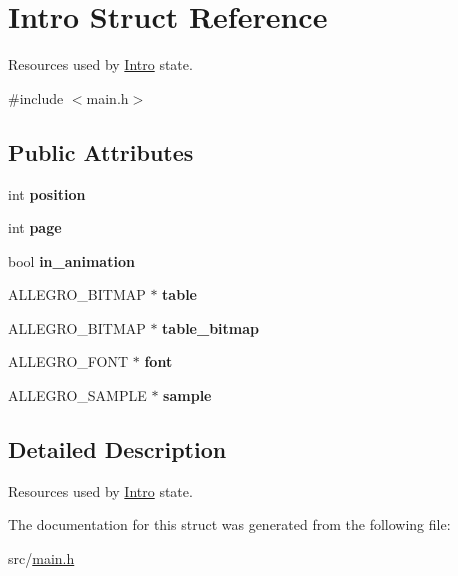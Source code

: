 \hypertarget{structIntro}{\section{\-Intro \-Struct \-Reference}
\label{structIntro}
}


\-Resources used by \hyperlink{structIntro}{\-Intro} state.  




{\ttfamily \#include $<$main.\-h$>$}

\subsection*{\-Public \-Attributes}
\begin{DoxyCompactItemize}
\item 
\hypertarget{structIntro_a5c266b2590d4304f92fd3bad033f4375}{int {\bfseries position}}\label{structIntro_a5c266b2590d4304f92fd3bad033f4375}

\item 
\hypertarget{structIntro_aaea1b2d24c0c9a5437c59d727c79ebd1}{int {\bfseries page}}\label{structIntro_aaea1b2d24c0c9a5437c59d727c79ebd1}

\item 
\hypertarget{structIntro_a2876fd8a7bfd940c3936eb6445984a22}{bool {\bfseries in\-\_\-animation}}\label{structIntro_a2876fd8a7bfd940c3936eb6445984a22}

\item 
\hypertarget{structIntro_a342227f3940dba9ed6b5d3bb4579fd48}{\-A\-L\-L\-E\-G\-R\-O\-\_\-\-B\-I\-T\-M\-A\-P $\ast$ {\bfseries table}}\label{structIntro_a342227f3940dba9ed6b5d3bb4579fd48}

\item 
\hypertarget{structIntro_a640d8fa662e2d06fb01069c4b374209e}{\-A\-L\-L\-E\-G\-R\-O\-\_\-\-B\-I\-T\-M\-A\-P $\ast$ {\bfseries table\-\_\-bitmap}}\label{structIntro_a640d8fa662e2d06fb01069c4b374209e}

\item 
\hypertarget{structIntro_a896d4fdd74cf47535173eeaa6e81f734}{\-A\-L\-L\-E\-G\-R\-O\-\_\-\-F\-O\-N\-T $\ast$ {\bfseries font}}\label{structIntro_a896d4fdd74cf47535173eeaa6e81f734}

\item 
\hypertarget{structIntro_a0189475d44f8e19e6fe543371a9daedb}{\-A\-L\-L\-E\-G\-R\-O\-\_\-\-S\-A\-M\-P\-L\-E $\ast$ {\bfseries sample}}\label{structIntro_a0189475d44f8e19e6fe543371a9daedb}

\end{DoxyCompactItemize}


\subsection{\-Detailed \-Description}
\-Resources used by \hyperlink{structIntro}{\-Intro} state. 

\-The documentation for this struct was generated from the following file\-:\begin{DoxyCompactItemize}
\item 
src/\hyperlink{main_8h}{main.\-h}\end{DoxyCompactItemize}
